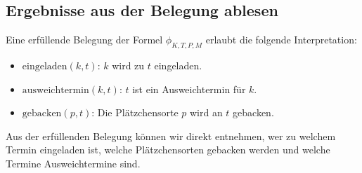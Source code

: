 \documentclass[12pt,a4paper]{article}
\begin{document}
\subsection*{Ergebnisse aus der Belegung ablesen}
Eine erfüllende Belegung der Formel $\phi_{K,T,P,M}$ erlaubt die folgende Interpretation:
\begin{itemize}
    \item $\text{eingeladen}(k, t)$: $k$ wird zu $t$ eingeladen.
    \item $\text{ausweichtermin}(k, t)$: $t$ ist ein Ausweichtermin für $k$.
    \item $\text{gebacken}(p, t)$: Die Plätzchensorte $p$ wird an $t$ gebacken.
\end{itemize}
Aus der erfüllenden Belegung können wir direkt entnehmen, wer zu welchem Termin eingeladen ist, welche Plätzchensorten gebacken werden und welche Termine Ausweichtermine sind.
\end{document}
